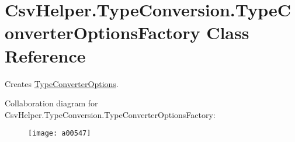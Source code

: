 \hypertarget{a00157}{\section{Csv\-Helper.\-Type\-Conversion.\-Type\-Converter\-Options\-Factory Class Reference}
\label{a00157}
}


Creates \hyperlink{a00156}{Type\-Converter\-Options}.  




Collaboration diagram for Csv\-Helper.\-Type\-Conversion.\-Type\-Converter\-Options\-Factory\-:
\nopagebreak
\begin{figure}[H]
\begin{center}
\leavevmode
\texttt{[image: a00547]}
\end{center}
\end{figure}
